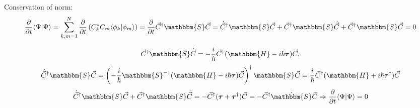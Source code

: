 \begin{frame}{}
\begin{block}{Conservation of norm:}
$$\frac{\partial}{\partial t}\myel{\Psi}{\Psi} = \sum_{k,m=1}^N\frac{\partial}{\partial t}\left( C_k^*C_m\myel{\phi_k}{\phi_m}\right) =%
  \frac{\partial}{\partial t}\vec{C}^{\dagger}\mathbbm{S}\vec{C} = \dot{\vec{C}}^{\dagger}\mathbbm{S}\vec{C} + %
								   \vec{C}^{\dagger}\mathbbm{S}\dot{\vec{C}} + %
								   \vec{C}^{\dagger}\dot{\mathbbm{S}}\vec{C}=0$$
\end{block}
$$\vec{C}^{\dagger}\mathbbm{S}\dot{\vec{C}} = -\frac{i}{\hbar}\vec{C}^{\dagger}(\mathbbm{H}-i\hbar\boldsymbol{\tau})\vec{C},$$
$$\dot{\vec{C}}^{\dagger}\mathbbm{S}\vec{C} = \left(-\frac{i}{\hbar}\mathbbm{S}^{-1}(\mathbbm{H}-i\hbar\boldsymbol{\tau})\vec{C}\right)^{\dagger}\mathbbm{S}\vec{C} = %
					    \frac{i}{\hbar}\vec{C}^{\dagger}(\mathbbm{H}+i\hbar\boldsymbol{\tau}^{\dagger})\vec{C}$$
$$\dot{\vec{C}}^{\dagger}\mathbbm{S}\vec{C} + \vec{C}^{\dagger}\mathbbm{S}\dot{\vec{C}} = %
					    - \vec{C}^{\dagger}(\boldsymbol{\tau}+\boldsymbol{\tau}^{\dagger})\vec{C} = -\vec{C}^{\dagger}\dot{\mathbbm{S}}\vec{C}\Rightarrow%
  \frac{\partial}{\partial t}\myel{\Psi}{\Psi} = 0$$
\end{frame}


